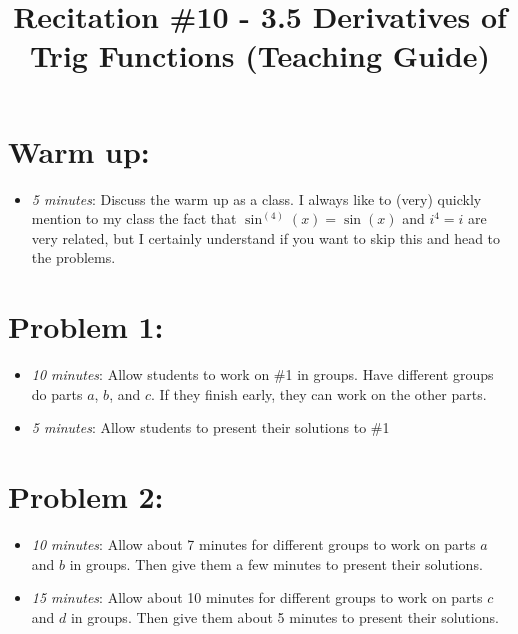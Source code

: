 \documentclass[handout,nooutcomes]{ximera}
\title{Recitation \#10 - 3.5 Derivatives of Trig Functions (Teaching Guide)}
\begin{document}
\begin{abstract}		\end{abstract}
\maketitle


\section*{Warm up:} 
	
	\begin{itemize}
	
	\item  \emph{5 minutes}:  Discuss the warm up as a class.  I always like to (very) quickly mention to my class the fact that $\sin^{(4)}(x) = \sin(x)$ and $i^4 = i$ are very related, but I certainly understand if you want to skip this and head to the problems.	
	\end{itemize}


\section*{Problem 1:}

	\begin{itemize}
	
	\item  \emph{10 minutes}:  Allow students to work on \#1 in groups.  Have different groups do parts $a$, $b$, and $c$.  If they finish early, they can work on the other parts.
	
	\item  \emph{5 minutes}:  Allow students to present their solutions to \#1
			
	\end{itemize}
	
	
	
\section*{Problem 2:}

	\begin{itemize}
	
	\item  \emph{10 minutes}:  Allow about 7 minutes for different groups to work on parts $a$ and $b$ in groups.  Then give them a few minutes to present their solutions.
	
	\item  \emph{15 minutes}:  Allow about 10 minutes for different groups to work on parts $c$ and $d$ in groups.  Then give them about 5 minutes to present their solutions.
	
	\end{itemize}
	
\end{document}
